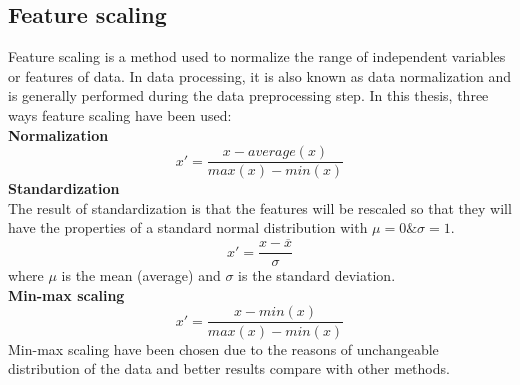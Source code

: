 \documentclass[12pt,a4paper]{report}
\begin{document}
\subsection{Feature scaling}
Feature scaling is a method used to normalize the range of independent variables or features of data. In data processing, it is also known as data normalization and is generally performed during the data preprocessing step. In this thesis, three ways feature scaling have been used:\\
\textbf{Normalization}
	\begin{equation}
	x' = \frac{x - average(x)}{max(x) - min(x)}
	\end{equation}
\textbf{Standardization} \\The result of standardization is that the features will be rescaled so that they will have the properties of a standard normal distribution with $\mu = 0 \& \sigma = 1$.
	\begin{equation}
	x' = \frac{x - \overline{x}}{\sigma}
	\end{equation}
where $\mu$ is the mean (average) and $\sigma$ is the standard deviation.\\
\textbf{Min-max scaling}
	\begin{equation}
	x' = \frac{x - min(x)}{max(x) - min(x)}
	\end{equation}
Min-max scaling have been chosen due to the reasons of unchangeable distribution of the data and better results compare with other methods.
\end{document}
